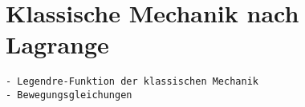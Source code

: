 %
%
%
\section{Klassische Mechanik nach Lagrange
\label{buch:mechanik:section:lagrange}}

\begin{verbatim}
- Legendre-Funktion der klassischen Mechanik
- Bewegungsgleichungen
\end{verbatim}
